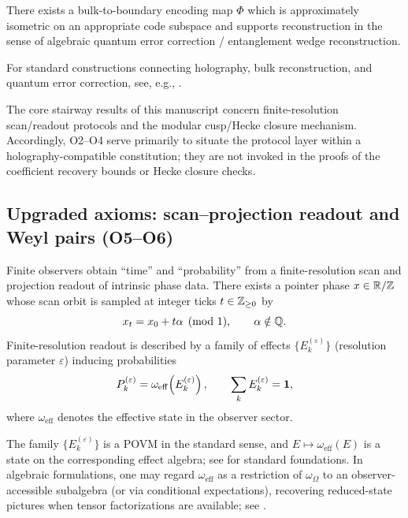 \begin{axiom}
There exists a bulk-to-boundary encoding map $\Phi$ which is approximately isometric on an appropriate code subspace and supports reconstruction in the sense of algebraic quantum error correction / entanglement wedge reconstruction.
\end{axiom}
\begin{remark}
For standard constructions connecting holography, bulk reconstruction, and quantum error correction, see, e.g., \cite{AlmheiriDongHarlow2015,Pastawski2015,Harlow2017}.
\end{remark}
\begin{remark}
The core stairway results of this manuscript concern finite-resolution scan/readout protocols and the modular cusp/Hecke closure mechanism. Accordingly, O2--O4 serve primarily to situate the protocol layer within a holography-compatible constitution; they are not invoked in the proofs of the coefficient recovery bounds or Hecke closure checks.
\end{remark}

\subsection{Upgraded axioms: scan--projection readout and Weyl pairs (O5--O6)}
\label{sec:axioms_O5_O6}

\begin{axiom}
Finite observers obtain ``time'' and ``probability'' from a finite-resolution scan and projection readout of intrinsic phase data. There exists a pointer phase $x\in\mathbb{R}/\mathbb{Z}$ whose scan orbit is sampled at integer ticks $t\in\mathbb{Z}_{\ge 0}$ by
\begin{equation}
x_t = x_0 + t\alpha \pmod 1,\qquad \alpha\notin\mathbb{Q}.
\end{equation}
Finite-resolution readout is described by a family of effects $\{E_k^{(\varepsilon)}\}$ (resolution parameter $\varepsilon$) inducing probabilities
\begin{equation}
P_k^{(\varepsilon)} = \omega_{\mathrm{eff}}\!\left(E_k^{(\varepsilon)}\right),\qquad \sum_k E_k^{(\varepsilon)}=\mathbf{1},
\end{equation}
where $\omega_{\mathrm{eff}}$ denotes the effective state in the observer sector.
\end{axiom}
\begin{remark}
The family $\{E_k^{(\varepsilon)}\}$ is a POVM in the standard sense, and $E\mapsto \omega_{\mathrm{eff}}(E)$ is a state on the corresponding effect algebra; see \cite{Kraus1983,NielsenChuang2000} for standard foundations. In algebraic formulations, one may regard $\omega_{\mathrm{eff}}$ as a restriction of $\omega_\Omega$ to an observer-accessible subalgebra (or via conditional expectations), recovering reduced-state pictures when tensor factorizations are available; see \cite{BratteliRobinson1997,Haag1996}.
\end{remark}

